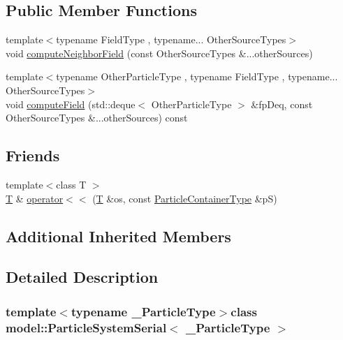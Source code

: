 \subsection*{Public Member Functions}
\begin{DoxyCompactItemize}
\item 
{\footnotesize template$<$typename Field\+Type , typename... Other\+Source\+Types$>$ }\\void \hyperlink{classmodel_1_1_particle_system_serial_a6d635a8e5e510bce8781f38bce53a9fe}{compute\+Neighbor\+Field} (const Other\+Source\+Types \&...other\+Sources)
\item 
{\footnotesize template$<$typename Other\+Particle\+Type , typename Field\+Type , typename... Other\+Source\+Types$>$ }\\void \hyperlink{classmodel_1_1_particle_system_serial_a8c7100247eaa48f31863d0902fd3d526}{compute\+Field} (std\+::deque$<$ Other\+Particle\+Type $>$ \&fp\+Deq, const Other\+Source\+Types \&...other\+Sources) const 
\end{DoxyCompactItemize}
\subsection*{Friends}
\begin{DoxyCompactItemize}
\item 
{\footnotesize template$<$class T $>$ }\\\hyperlink{_spline_node_base__corder1_8h_a82692d3a5502b91460591f1d5504314a}{T} \& \hyperlink{classmodel_1_1_particle_system_serial_ab12e91f48bb9a19e54a866d70c9ff9db}{operator$<$$<$} (\hyperlink{_spline_node_base__corder1_8h_a82692d3a5502b91460591f1d5504314a}{T} \&os, const \hyperlink{classmodel_1_1_particle_system_base_ac95d9a819d1da5e86f726494bf6df504}{Particle\+Container\+Type} \&p\+S)
\end{DoxyCompactItemize}
\subsection*{Additional Inherited Members}


\subsection{Detailed Description}
\subsubsection*{template$<$typename \+\_\+\+Particle\+Type$>$class model\+::\+Particle\+System\+Serial$<$ \+\_\+\+Particle\+Type $>$}

